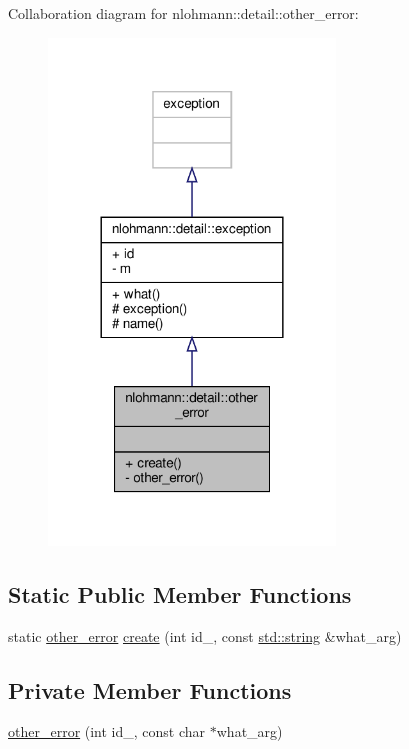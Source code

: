 Collaboration diagram for nlohmann\+:\+:detail\+:\+:other\+\_\+error\+:
\nopagebreak
\begin{figure}[H]
\begin{center}
\leavevmode
\includegraphics[width=216pt]{classnlohmann_1_1detail_1_1other__error__coll__graph}
\end{center}
\end{figure}
\subsection*{Static Public Member Functions}
\begin{DoxyCompactItemize}
\item 
static \hyperlink{classnlohmann_1_1detail_1_1other__error}{other\+\_\+error} \hyperlink{classnlohmann_1_1detail_1_1other__error_a87e8ab894e8c85c0d97a0919782d3683}{create} (int id\+\_\+, const \hyperlink{namespacenlohmann_1_1detail_a1ed8fc6239da25abcaf681d30ace4985ab45cffe084dd3d20d928bee85e7b0f21}{std\+::string} \&what\+\_\+arg)
\end{DoxyCompactItemize}
\subsection*{Private Member Functions}
\begin{DoxyCompactItemize}
\item 
\hyperlink{classnlohmann_1_1detail_1_1other__error_adf9227d6ca5161508f6a598a0dc6e7cd}{other\+\_\+error} (int id\+\_\+, const char $\ast$what\+\_\+arg)
\end{DoxyCompactItemize}
